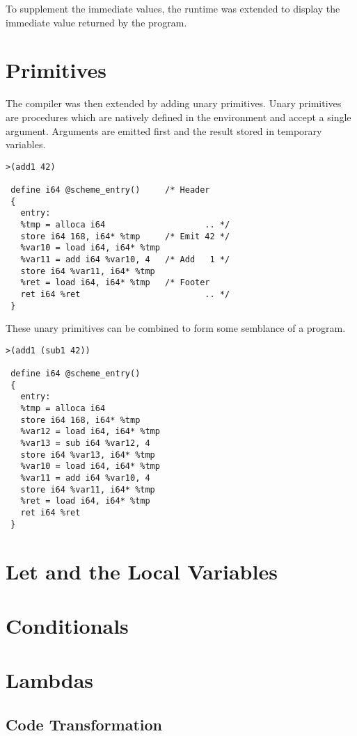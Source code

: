 \documentclass{article}
\begin{document}
To supplement the immediate values, the runtime was extended to display the immediate value returned by the program. 

\section{Primitives}

The compiler was then extended by adding unary primitives. Unary primitives are procedures which are natively defined in the environment and accept a single argument. Arguments are emitted first and the result stored in temporary variables. 

\begin{verbatim}
>(add1 42)

 define i64 @scheme_entry()     /* Header
 {
   entry:
   %tmp = alloca i64                    .. */
   store i64 168, i64* %tmp     /* Emit 42 */ 
   %var10 = load i64, i64* %tmp 
   %var11 = add i64 %var10, 4   /* Add   1 */
   store i64 %var11, i64* %tmp  
   %ret = load i64, i64* %tmp   /* Footer 
   ret i64 %ret                         .. */
 }
\end{verbatim}

These unary primitives can be combined to form some semblance of a program.

\begin{verbatim}
>(add1 (sub1 42))

 define i64 @scheme_entry()
 {
   entry: 
   %tmp = alloca i64
   store i64 168, i64* %tmp
   %var12 = load i64, i64* %tmp
   %var13 = sub i64 %var12, 4
   store i64 %var13, i64* %tmp
   %var10 = load i64, i64* %tmp
   %var11 = add i64 %var10, 4
   store i64 %var11, i64* %tmp
   %ret = load i64, i64* %tmp
   ret i64 %ret
 }
\end{verbatim}


\section{Let and the Local Variables}

\section{Conditionals}

\section{Lambdas}

\subsection{Code Transformation}
\end{document}
